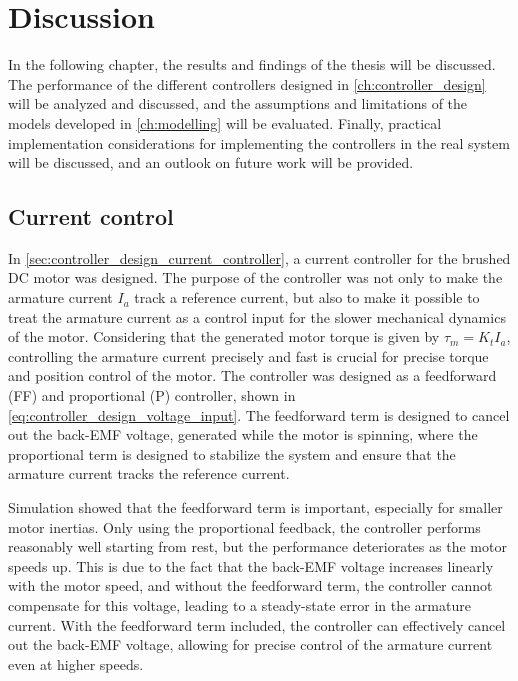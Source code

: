 \chapter{Discussion}%
\label{ch:discussion}

In the following chapter, the results and findings of the thesis will be discussed. The performance of the different controllers designed in \cref{ch:controller_design} will be analyzed and discussed, and the assumptions and limitations of the models developed in \cref{ch:modelling} will be evaluated. Finally, practical implementation considerations for implementing the controllers in the real system will be discussed, and an outlook on future work will be provided.

\section{Current control}%
\label{sec:discussion_current_control}

In \cref{sec:controller_design_current_controller}, a current controller for the brushed DC motor was designed. The purpose of the controller was not only to make the armature current $I_a$ track a reference current, but also to make it possible to treat the armature current as a control input for the slower mechanical dynamics of the motor. Considering that the generated motor torque is given by $\tau_m = K_t I_a$, controlling the armature current precisely and fast is crucial for precise torque and position control of the motor. The controller was designed as a feedforward (FF) and proportional (P) controller, shown in \cref{eq:controller_design_voltage_input}. The feedforward term is designed to cancel out the back-EMF voltage, generated while the motor is spinning, where the proportional term is designed to stabilize the system and ensure that the armature current tracks the reference current. 

Simulation showed that the feedforward term is important, especially for smaller motor inertias. Only using the proportional feedback, the controller performs reasonably well starting from rest, but the performance deteriorates as the motor speeds up. This is due to the fact that the back-EMF voltage increases linearly with the motor speed, and without the feedforward term, the controller cannot compensate for this voltage, leading to a steady-state error in the armature current. With the feedforward term included, the controller can effectively cancel out the back-EMF voltage, allowing for precise control of the armature current even at higher speeds.

